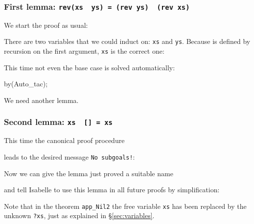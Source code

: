 \subsubsection*{First lemma: \texttt{rev(xs \at~ys) = (rev ys) \at~(rev xs)}}

We start the proof as usual:
\begin{ttbox}\makeatother
\end{ttbox}
There are two variables that we could induct on: \texttt{xs} and
\texttt{ys}. Because \texttt{\at} is defined by recursion on
the first argument, \texttt{xs} is the correct one:
\begin{ttbox}
\end{ttbox}
This time not even the base case is solved automatically:
\begin{ttbox}\makeatother
by(Auto_tac);
\end{ttbox}
We need another lemma.

\subsubsection*{Second lemma: \texttt{xs \at~[] = xs}}

This time the canonical proof procedure
\begin{ttbox}\makeatother
\end{ttbox}
leads to the desired message \texttt{No subgoals!}:
\begin{ttbox}\makeatother
{}
\end{ttbox}
Now we can give the lemma just proved a suitable name
\begin{ttbox}
\end{ttbox}
and tell Isabelle to use this lemma in all future proofs by simplification:
\begin{ttbox}
\end{ttbox}
Note that in the theorem \texttt{app_Nil2} the free variable \texttt{xs} has
been replaced by the unknown \texttt{?xs}, just as explained in
\S\ref{sec:variables}.

